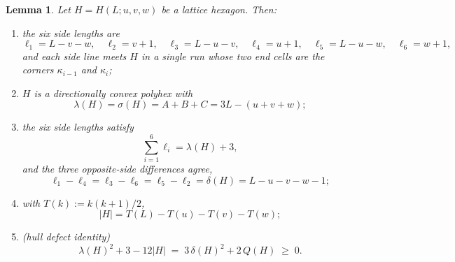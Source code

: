 \documentclass[11pt]{article}
\theoremstyle{plain}
\newtheorem{lemma}[theorem]{Lemma}
\theoremstyle{definition}
\theoremstyle{remark}
\begin{document}
\begin{lemma}\label{lem:hex}
Let \(H=H(L;u,v,w)\) be a lattice hexagon. Then:
\begin{enumerate}
\item[(i)] the six side lengths are
\[
   \ell_{1}=L-v-w,\quad \ell_{2}=v+1,\quad \ell_{3}=L-u-v,\quad
   \ell_{4}=u+1,\quad \ell_{5}=L-u-w,\quad \ell_{6}=w+1 ,
\]
and each side line meets \(H\) in a single run whose two end cells are the corners
\(\kappa_{i-1}\) and \(\kappa_{i}\);
\item[(ii)] \(H\) is a directionally convex polyhex with
\[
   \lambda(H)=\sigma(H)=A+B+C=3L-(u+v+w);
\]
\item[(iii)] the six side lengths satisfy
\begin{equation}\label{eq:sidesum}
   \sum_{i=1}^{6}\ell_{i}=\lambda(H)+3 ,
\end{equation}
and the three opposite-side differences agree,
\begin{equation}\label{eq:delta}
   \ell_{1}-\ell_{4}=\ell_{3}-\ell_{6}=\ell_{5}-\ell_{2}=\delta(H)=L-u-v-w-1 ;
\end{equation}
\item[(iv)] with \(T(k):=k(k+1)/2\),
\[
   |H|=T(L)-T(u)-T(v)-T(w) ;
\]
\item[(v)] \textup{(hull defect identity)}
\begin{equation}\label{eq:defectid}
   \lambda(H)^{2}+3-12|H| \;=\; 3\,\delta(H)^{2}+2\,Q(H)\;\ge\;0 .
\end{equation}

\end{enumerate}
\end{lemma}
\end{document}
